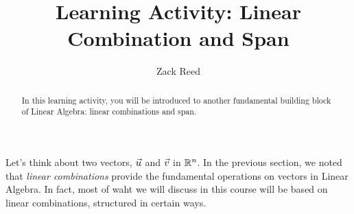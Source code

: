 \documentclass{ximera}
\author{Zack Reed}
\title{Learning Activity: Linear Combination and Span}
\begin{document}
\begin{abstract}

    In this learning activity, you will be introduced to another fundamental building block of Linear Algebra: linear combinations and span.

\end{abstract}
\maketitle

Let's think about two vectors, $\vec{u}$ and $\vec{v}$ in $\mathbb{R}^n$. In the previous section, we noted that \emph{linear combinations} provide the fundamental operations on vectors in Linear Algebra. In fact, most of waht we will discuss in this course will be based on linear combinations, structured in certain ways.
\end{document}
